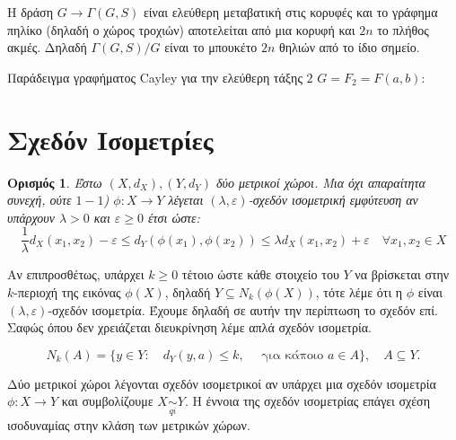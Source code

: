 \documentclass[oneside,a4paper]{article}
\newtheorem*{defn}{Ορισμός}
\newcommand {\tl}{\textlatin}
\begin{document}
\noindent Η δράση $G \rightarrow \Gamma(G,S)$ είναι ελεύθερη μεταβατική στις κορυφές και το γράφημα πηλίκο (δηλαδή ο χώρος τροχιών) αποτελείται από μια κορυφή και $2n$ το πλήθος ακμές. Δηλαδή $\Gamma(G,S)/G$ είναι το μπουκέτο $2n$ θηλιών από το ίδιο σημείο.

\pagebreak
\noindent Παράδειγμα γραφήματος \tl{Cayley} για την ελεύθερη τάξης $2$ $G=F_2 = F(a,b)$:
\begin{figure}[ht]
	\centering
{}
\end{figure}


\pagebreak
\section{Σχεδόν Ισομετρίες}



\begin{defn} Έστω $(X,d_X), (Y,d_Y)$ δύο μετρικοί χώροι. Μια όχι απαραίτητα συνεχή, ούτε $1-1$) $\phi : X \rightarrow Y$ λέγεται $(\lambda,\varepsilon)$-σχεδόν ισομετρική εμφύτευση αν υπάρχουν $\lambda > 0$ και $\varepsilon \geq 0$ έτσι ώστε:
	$$\frac{1}{\lambda} d_X (x_1,x_2) - \varepsilon \leq d_Y ( \phi (x_1), \phi (x_2)) \leq  \lambda d_X (x_1,x_2) + \varepsilon \quad \forall x_1,x_2 \in X$$
\end{defn}


\noindent Αν επιπροσθέτως, υπάρχει $k\geq 0$ τέτοιο ώστε κάθε στοιχείο του $Y$ να βρίσκεται στην $k$-περιοχή της εικόνας $\phi (X)$, δηλαδή $Y \subseteq N_k(\phi(X))$, τότε λέμε ότι η $\phi$ είναι $(\lambda,\varepsilon)$-σχεδόν ισομετρία. Έχουμε δηλαδή σε αυτήν την περίπτωση το σχεδόν επί. Σαφώς όπου δεν χρειάζεται διευκρίνηση λέμε απλά σχεδόν ισομετρία.

$$N_k(A) = \{y \in Y: \quad d_Y(y,a)\leq k, \quad \text{ για κάποιο } a \in A\}, \quad A \subseteq Y.$$

\noindent Δύο μετρικοί χώροι λέγονται σχεδόν ισομετρικοί αν υπάρχει μια σχεδόν ισομετρία $\phi :X \rightarrow Y$ και συμβολίζουμε $X \underset{qi}{\sim} Y$. Η έννοια της σχεδόν ισομετρίας επάγει σχέση ισοδυναμίας στην κλάση των μετρικών χώρων.
\end{document}
